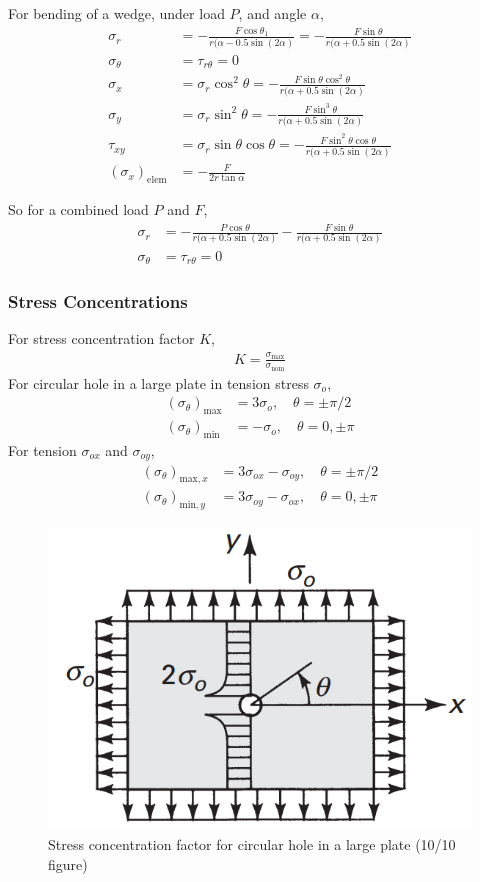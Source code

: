 For bending of a wedge, under load $P$, and angle $\alpha$,
\begin{align*}
    \sigma_{r} &= -\frac{F \cos{\theta_1}}{r(\alpha - 0.5\sin(2\alpha)} = -\frac{F \sin{\theta}}{r(\alpha + 0.5\sin(2\alpha)} \\
    \sigma_{\theta} &= \tau_{r\theta} = 0 \\
    \sigma_x &= \sigma_r \cos^2{\theta} = -\frac{F \sin\theta \cos^2\theta}{r(\alpha + 0.5\sin(2\alpha)} \\
    \sigma_y &= \sigma_r \sin^2{\theta} = -\frac{F \sin^3\theta}{r(\alpha + 0.5\sin(2\alpha)} \\
    \tau_{xy} &= \sigma_r \sin\theta \cos\theta = -\frac{F \sin^2\theta \cos\theta}{r(\alpha + 0.5\sin(2\alpha)} \\
    (\sigma_{x})_{\text{elem}} &= -\frac{F}{2r\tan\alpha}
\end{align*}

So for a combined load $P$ and $F$,
\begin{align*}
    \sigma_r &= -\frac{P \cos{\theta}}{r(\alpha + 0.5\sin(2\alpha)} -\frac{F \sin{\theta}}{r(\alpha + 0.5\sin(2\alpha)} \\
    \sigma_{\theta} &= \tau_{r\theta} = 0 
\end{align*}


\subsubsection*{Stress Concentrations}
For stress concentration factor $K$,
\begin{align*}
    K = \frac{\sigma_{\text{max}}}{\sigma_{\text{nom}}}
\end{align*}
For circular hole in a large plate in tension stress $\sigma_o$,
\begin{align*}
    (\sigma_{\theta})_{\text{max}} &= 3 \sigma_o, \quad \theta = \pm \pi/2 \\
    (\sigma_{\theta})_{\text{min}} &= - \sigma_o, \quad \theta = 0, \pm \pi
\end{align*}
For tension $\sigma_{ox}$ and $\sigma_{oy}$,
\begin{align*}
    (\sigma_{\theta})_{\text{max}, x} &= 3 \sigma_{ox} - \sigma_{oy}, \quad \theta = \pm \pi/2 \\
    (\sigma_{\theta})_{\text{min}, y} &= 3 \sigma_{oy} - \sigma_{ox}, \quad \theta = 0, \pm \pi
\end{align*}
\begin{figure}[H]
    \centering
    \includegraphics[width=0.3\linewidth]{Figures/sec3 hole in large plate.png}
    \caption{Stress concentration factor for circular hole in a large plate (10/10 figure)}
    \label{fig:sec3 stress concentration for circular hole in large plate}
\end{figure}
